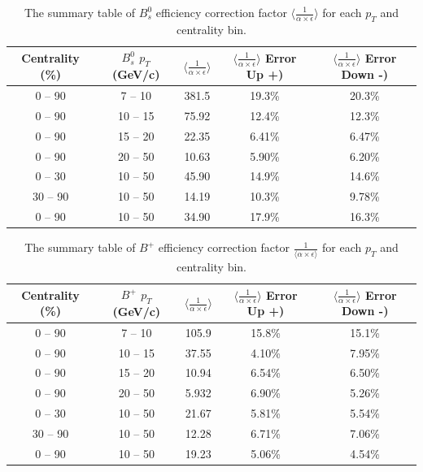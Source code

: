 \begin{table}[h]
\begin{center}
\caption{The summary table of $B^0_s$ efficiency correction factor $\langle\frac{1}{\alpha \times \epsilon} \rangle$ for each $p_T$ and centrality bin.}
\vspace{1em}
\label{BsEffTab}
  \begin{tabular}{ |c|c|c|c|c|}
    \hline 
Centrality (\%) & $B^0_s$ $p_T$ (GeV/c) & $\langle\frac{1}{\alpha \times \epsilon} \rangle$ & $\langle\frac{1}{\alpha \times \epsilon} \rangle$ Error Up +) &$\langle\frac{1}{\alpha \times \epsilon} \rangle$ Error Down -) \\
     \hline
0 -- 90 & 7 -- 10 & 381.5  &  19.3\% & 20.3\% \\
0 -- 90 & 10 -- 15 & 75.92 &  12.4\% & 12.3\% \\
0 -- 90 & 15 -- 20 & 22.35 &   6.41\% & 6.47\% \\
0 -- 90 & 20 -- 50 & 10.63 & 5.90\% &  6.20\% \\
0 -- 30 & 10 -- 50 & 45.90 & 14.9\% & 14.6\%  \\
30 -- 90 & 10 -- 50 & 14.19 & 10.3\% & 9.78\% \\
0 -- 90 & 10 -- 50 & 34.90 & 17.9\% & 16.3\% \\
     \hline
    \hline
\end{tabular}
\end{center}
\end{table}


\begin{table}[h]
\begin{center}
\caption{The summary table of $B^+$ efficiency correction factor $\frac{1}{\langle\alpha \times \epsilon \rangle}$ for each $p_T$ and centrality bin.}
\vspace{1em}
\label{BPEffTab}
  \begin{tabular}{ |c|c|c|c|c|}
    \hline 
Centrality (\%) & $B^+$ $p_T$ (GeV/c) &$\langle\frac{1}{\alpha \times \epsilon} \rangle$ & $\langle\frac{1}{\alpha \times \epsilon} \rangle$ Error Up +) & $\langle\frac{1}{\alpha \times \epsilon} \rangle$ Error Down -) \\
     \hline
0 -- 90 & 7 -- 10 & 105.9  &  15.8\% & 15.1\% \\
0 -- 90 & 10 -- 15 & 37.55 &  4.10\% & 7.95\% \\
0 -- 90 & 15 -- 20 & 10.94 &   6.54\% & 6.50\% \\
0 -- 90 & 20 -- 50 & 5.932 & 6.90\% &  5.26\% \\
0 -- 30 & 10 -- 50 & 21.67 & 5.81\% & 5.54\%  \\
30 -- 90 & 10 -- 50 & 12.28 & 6.71\% & 7.06\% \\
0 -- 90 & 10 -- 50 & 19.23 & 5.06\% & 4.54\% \\
     \hline
    \hline
\end{tabular}
\end{center}
\end{table}

